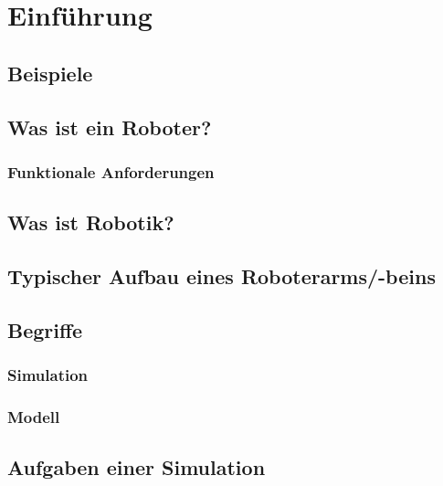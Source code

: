 \chapter{Einführung} %

    \section{Beispiele} %

    \section{Was ist ein Roboter?} %

        \subsection{Funktionale Anforderungen} %

    \section{Was ist Robotik?} %

    \section{Typischer Aufbau eines Roboterarms/-beins} %

    \section{Begriffe} %

        \subsection{Simulation} %

        \subsection{Modell} %

    \section{Aufgaben einer Simulation} %

